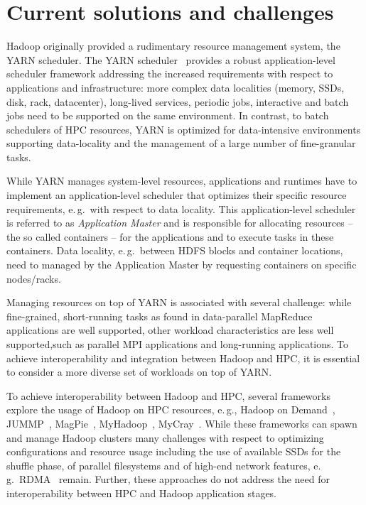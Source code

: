 \section{Current solutions and challenges}
\label{sec:hpc_hadoop_rel}
Hadoop originally provided a rudimentary resource management system, the YARN scheduler.
The YARN scheduler~\cite{vavilapalli2013apache} provides a robust application-level scheduler framework addressing the increased requirements with respect to applications and infrastructure: 
more complex data localities (memory, SSDs, disk, rack, datacenter), long-lived services, periodic jobs, interactive and batch jobs need to be supported on the same environment.
In contrast, to batch schedulers of HPC resources, YARN is optimized for data-intensive environments supporting data-locality and the management of a large number of fine-granular tasks.

While YARN manages system-level resources, applications and runtimes have to implement an application-level scheduler that optimizes their specific resource requirements, e.\,g.\ with respect to data locality. This application-level scheduler is referred to as {\it Application Master} and is responsible for allocating resources -- the so called containers -- for the applications and to execute tasks in these containers.
Data locality, e.\,g.\ between HDFS blocks and container locations, need to managed by the Application Master by requesting containers on specific nodes/racks.

Managing resources on top of YARN is associated with several challenge: while fine-grained, short-running tasks as found in data-parallel MapReduce applications are well supported, other workload characteristics are less well supported,such as parallel MPI applications and long-running applications.
To achieve interoperability and integration between Hadoop and HPC, it is essential to consider a more diverse set of workloads on top of  YARN.

To achieve interoperability between Hadoop and HPC, several frameworks explore the usage of Hadoop on HPC resources, e.\,g., Hadoop on Demand~\cite{hod}, JUMMP~\cite{moody2013jummp}, MagPie~\cite{chu2015magpie}, MyHadoop~\cite{krishnan2011myhadoop}, MyCray~\cite{mycray}.
While these frameworks can spawn and manage Hadoop clusters many challenges with respect to optimizing configurations and resource usage including the use of available SSDs for the shuffle phase, of parallel filesystems and of high-end network features, e.\,g.\ RDMA~\cite{rahman2014homr} remain.
Further, these approaches do not address the need for interoperability between HPC and Hadoop application stages.

